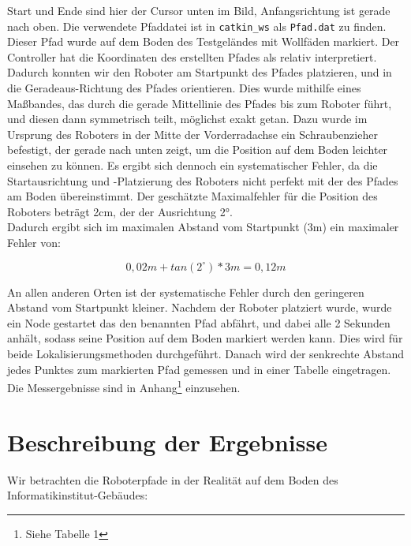 \documentclass[11pt,a4paper]{article}
\begin{document}
Start und Ende sind hier der Cursor unten im Bild, Anfangsrichtung ist gerade nach oben. Die verwendete Pfaddatei ist in \verb+catkin_ws+ als 
\verb+Pfad.dat+ zu finden.
Dieser Pfad wurde auf dem Boden des Testgeländes mit Wollfäden markiert. Der Controller hat die Koordinaten des erstellten Pfades 
als relativ interpretiert. Dadurch konnten wir den Roboter am Startpunkt des Pfades platzieren, und in die Geradeaus-Richtung des Pfades orientieren. 
Dies wurde mithilfe eines Maßbandes, das durch die gerade Mittellinie des Pfades bis zum Roboter führt, und diesen dann symmetrisch teilt, möglichst exakt getan. 
Dazu wurde im Ursprung des Roboters in der Mitte der Vorderradachse ein Schraubenzieher befestigt, der gerade nach unten zeigt, um die Position auf dem 
Boden leichter einsehen zu können. Es ergibt sich dennoch ein systematischer Fehler, da die Startausrichtung und -Platzierung des Roboters nicht perfekt 
mit der des Pfades am Boden übereinstimmt. Der geschätzte Maximalfehler für die Position des Roboters beträgt 2cm, der der Ausrichtung 2°. 
\\Dadurch ergibt sich im maximalen Abstand vom Startpunkt (3m) ein maximaler Fehler von: \vspace*{-2mm}

\begin{equation*}
  0,02m + tan(2^\circ) * 3m = 0,12m
\end{equation*}

An allen anderen Orten ist der systematische Fehler durch den geringeren Abstand vom Startpunkt kleiner.
Nachdem der Roboter platziert wurde, wurde ein Node gestartet das den benannten Pfad abfährt, und dabei alle 2 Sekunden anhält, sodass seine Position 
auf dem Boden markiert werden kann. Dies wird für beide Lokalisierungsmethoden durchgeführt. Danach wird der senkrechte Abstand jedes Punktes 
zum markierten Pfad gemessen und in einer Tabelle eingetragen. Die Messergebnisse sind in Anhang\footnote{Siehe Tabelle 1} einzusehen.

\section{Beschreibung der Ergebnisse}

Wir betrachten die Roboterpfade in der Realität auf dem Boden des Informatikinstitut-Gebäudes:
\end{document}
